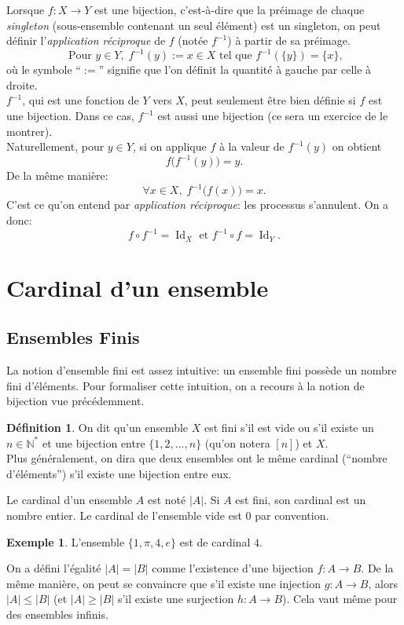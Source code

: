 \documentclass[oneside,12pt,french,table]{book}
\DeclareMathOperator{\id}{Id}
\theoremstyle{definition}
\theoremstyle{definition}
\newtheorem*{example}{Exemple}
\theoremstyle{definition}
\newtheorem{definition}{Définition}[chapter]
\begin{document}
Lorsque $f: X \longrightarrow Y$ est une bijection, c'est-à-dire que la préimage de chaque \textit{singleton} (sous-ensemble contenant un seul élément) est un singleton, on peut définir l'\textit{application réciproque} de $f$ (notée $f^{-1}$) à partir de sa préimage.
$$\text{ Pour } y \in Y, \; f^{-1}(y) := x \in X \text{ tel que } f^{-1}(\{y\})=\{x\},$$
où le symbole ``$:=$'' signifie que l'on définit la quantité à gauche par celle à droite. \\
$f^{-1}$, qui est une fonction de $Y$ vers $X$, peut seulement être bien définie si $f$ est une bijection. Dans ce cas, $f^{-1}$ est aussi une bijection (ce sera un exercice de le montrer). \\
Naturellement, pour $y \in Y$, si on applique $f$ à la valeur de $f^{-1}(y)$ on obtient $$f \Big( f^{-1}(y) \Big) = y.$$
De la même manière:
$$\forall x \in X, \; f^{-1} \Big( f(x) \Big) = x.$$
C'est ce qu'on entend par \textit{application réciproque}: les processus s'annulent. On a donc:
$$f \circ f^{-1} = \id_X \text{ et } f^{-1} \circ f = \id_Y.$$
\section{Cardinal d'un ensemble}
\subsection*{Ensembles Finis}
\noindent
La notion d'ensemble fini est assez intuitive: un ensemble fini possède un nombre fini d'éléments. Pour formaliser cette intuition, on a recours à la notion de bijection vue précédemment.
\begin{definition}
On dit qu'un ensemble $X$ est fini s'il est vide ou s'il existe un $n \in \mathbb{N}^*$ et une bijection entre $\{1, 2, ..., n\}$ (qu'on notera $[n]$) et $X$. \\
Plus généralement, on dira que deux ensembles ont le même cardinal (``nombre d'éléments'') s'il existe une bijection entre eux.
\end{definition}
\noindent
Le cardinal d'un ensemble $A$ est noté $\vert A \vert$. Si $A$ est fini, son cardinal est un nombre entier. Le cardinal de l'ensemble vide est $0$ par convention.
\begin{example}
L'ensemble $\{1,\pi, 4, e\}$ est de cardinal $4$.
\end{example}
\noindent On a défini l'égalité $\vert A \vert = \vert B \vert$ comme l'existence d'une bijection $f: A \longrightarrow B$.
De la même manière, on peut se convaincre que s'il existe une injection $g: A \longrightarrow B$, alors $\vert A \vert \leq \vert B \vert$ (et $\vert A \vert \geq \vert B \vert$ s'il existe une surjection $h: A \longrightarrow B$). Cela vaut même pour des ensembles infinis.
\end{document}
